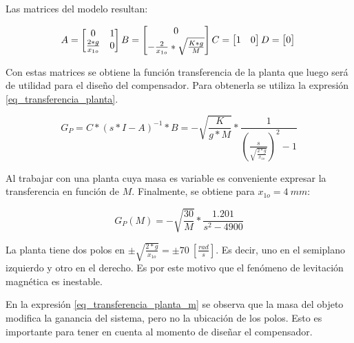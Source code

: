 \noindent Las matrices del modelo resultan:

\begin{equation*}
	A=
	\begin{bmatrix}
		0 & 1\\
		\frac{2*g}{x_{1o}} & 0
	\end{bmatrix}\\
	  B=
	\begin{bmatrix}
	0\\
	-\frac{2}{x_{1o}}*\sqrt{\frac{K*g}{M}}
	\end{bmatrix}\\
	  C=
	\begin{bmatrix}
	1 & 0\\
	\end{bmatrix}\\
	  D=
	\begin{bmatrix}
	0\\
	\end{bmatrix}\\
\end{equation*}


Con estas matrices se obtiene la función transferencia de la planta que luego será de utilidad para el diseño del compensador. Para obtenerla se utiliza la expresión \ref{eq_transferencia_planta}.

\begin{equation}\label{eq_transferencia_planta}
	G_{P}=C*(s*I-A)^{-1}*B=-\sqrt{\frac{K}{g*M}}*\frac{1}{{(\frac{s}{\sqrt{\frac{2*g}{x_{1o}}}})^2-1}}
\end{equation}

\noindent \noindent Al trabajar con una planta cuya masa es variable es conveniente expresar la transferencia en función de $M$. Finalmente, se obtiene para $x_{1o}=4\:mm$:

\begin{equation} \label{eq_transferencia_planta_m}
	G_{P}(M)=-\sqrt{\frac{30}{M}}*\frac{1.201}{s^{2}-4900}
\end{equation}

\noindent La planta tiene dos polos en $\pm\sqrt{\frac{2*g}{x_{1o}}}=\pm70\:[\frac{rad}{s}]$. Es decir, uno en el semiplano izquierdo y otro en el derecho. Es por este motivo que el fenómeno de levitación magnética es inestable.

\noindent En la expresión \ref{eq_transferencia_planta_m} se observa que la masa del objeto modifica la ganancia del sistema, pero no la ubicación de los polos. Esto es importante para tener en cuenta al momento de diseñar el compensador.


